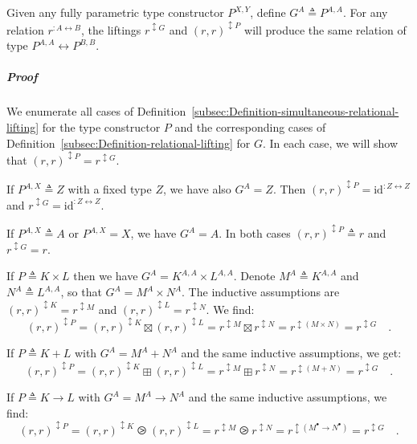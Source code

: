 Given any fully parametric type constructor $P^{X,Y}$, define $G^{A}\triangleq P^{A,A}$.
For any relation $r^{:A\leftrightarrow B}$, the liftings $r^{\updownarrow G}$
and $\left(r,r\right)^{\updownarrow P}$ will produce the same relation
of type $P^{A,A}\leftrightarrow P^{B,B}$.

\subparagraph{Proof}

We enumerate all cases of Definition~\ref{subsec:Definition-simultaneous-relational-lifting}
for the type constructor $P$ and the corresponding cases of Definition~\ref{subsec:Definition-relational-lifting}
for $G$. In each case, we will show that $(r,r)^{\updownarrow P}=r^{\updownarrow G}$.

If $P^{A,X}\triangleq Z$ with a fixed type $Z$, we have also $G^{A}=Z$.
Then $(r,r)^{\updownarrow P}=\text{id}^{:Z\leftrightarrow Z}$ and
$r^{\updownarrow G}=\text{id}^{:Z\leftrightarrow Z}$.

If $P^{A,X}\triangleq A$ or $P^{A,X}=X$, we have $G^{A}=A$. In
both cases $(r,r)^{\updownarrow P}\triangleq r$ and $r^{\updownarrow G}=r$.

If $P\triangleq K\times L$ then we have $G^{A}=K^{A,A}\times L^{A,A}$.
Denote $M^{A}\triangleq K^{A,A}$ and $N^{A}\triangleq L^{A,A}$,
so that $G^{A}=M^{A}\times N^{A}$. The inductive assumptions are
$(r,r)^{\updownarrow K}=r^{\updownarrow M}$ and $(r,r)^{\updownarrow L}=r^{\updownarrow N}$.
We find:
\[
(r,r)^{\updownarrow P}=(r,r)^{\updownarrow K}\boxtimes(r,r)^{\updownarrow L}=r^{\updownarrow M}\boxtimes r^{\updownarrow N}=r^{\updownarrow(M\times N)}=r^{\updownarrow G}\quad.
\]

If $P\triangleq K+L$ with $G^{A}=M^{A}+N^{A}$ and the same inductive
assumptions, we get: 
\[
(r,r)^{\updownarrow P}=(r,r)^{\updownarrow K}\boxplus(r,r)^{\updownarrow L}=r^{\updownarrow M}\boxplus r^{\updownarrow N}=r^{\updownarrow(M+N)}=r^{\updownarrow G}\quad.
\]

If $P\triangleq K\rightarrow L$ with $G^{A}=M^{A}\rightarrow N^{A}$
and the same inductive assumptions, we find: 
\[
(r,r)^{\updownarrow P}=(r,r)^{\updownarrow K}\ogreaterthan(r,r)^{\updownarrow L}=r^{\updownarrow M}\ogreaterthan r^{\updownarrow N}=r^{\updownarrow(M^{\bullet}\rightarrow N^{\bullet})}=r^{\updownarrow G}\quad.
\]

